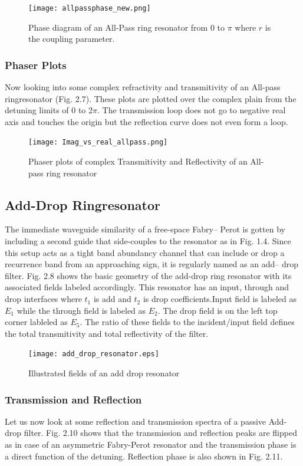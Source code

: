 \begin{figure}[h]
\centering
\texttt{[image: allpassphase\_new.png]}
\caption{Phase diagram of an All-Pass ring resonator from 0 to $\pi$ where $r$ is the coupling parameter.}
\end{figure}

\subsubsection{Phaser Plots}
Now looking into some complex refractivity and transmitivity of an All-pass ringresonator (Fig. 2.7). These plots are plotted over the complex plain from the detuning limits of 0 to 2$\pi$. The transmission loop does not go to negative real axis and touches the origin but the reflection curve does not even form a loop.
\begin{figure}[h]
\centering
\texttt{[image: Imag\_vs\_real\_allpass.png]}
\caption{Phaser plots of complex Transmitivity and Reflectivity of an All-pass ring resonator}
\end{figure}
\newpage

\subsection{Add-Drop Ringresonator}
The immediate waveguide similarity of a free-space Fabry– Perot is gotten by including a second guide that side-couples to the resonator as in Fig. 1.4.
Since this setup acts as a tight band abundancy channel that can include or drop a recurrence band from an approaching sign, it is regularly named as an add– drop filter. Fig. 2.8 shows the basic geometry of the add-drop ring resonator with its associated fields labeled accordingly. This resonator has an input, through and drop interfaces where $t_{1}$ is add and $t_{2}$ is drop coefficients.Input field is labeled as $E_{1}$ while the through field is labeled as $E_{2}$. The drop field is on the left top corner lableled as $E_{5}$. The ratio of these fields to the incident/input field defines the total transmitivity and total reflectivity of the filter. 
\begin{figure}[h]
\centering
\texttt{[image: add\_drop\_resonator.eps]}
\caption{Illustrated fields of an add drop resonator}
\end{figure}

\subsubsection{Transmission and Reflection}
Let us now look at some reflection and transmission spectra of a passive Add- drop filter. Fig. 2.10 shows that the transmission and reflection peaks are flipped as in case of an asymmetric Fabry-Perot resonator and the transmission phase is a direct function of the detuning. Reflection phase is also shown in Fig. 2.11.

